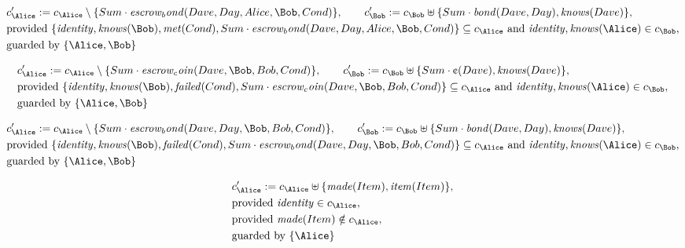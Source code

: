 \begin{align*}
&
c'_
{
\Alice
}
 := 
c_
{
\Alice
}
 \setminus 
\{
Sum
\cdot
\mathit{
escrow_bond
}
(
Dave
,
Day
,
Alice
,
\Bob
,
Cond
)
\}
, \qquad 
c'_
{
\Bob
}
 := 
c_
{
\Bob
}
 \uplus 
\{
Sum
\cdot
\mathit{
bond
}
(
Dave
,
Day
)
,
\mathit{
knows
}
(
Dave
)
\}
,\\
&
\text{provided } 
\{
\mathit{
identity
}
,
\mathit{
knows
}
(
\Bob
)
,
\mathit{
met
}
(
Cond
)
,
Sum
\cdot
\mathit{
escrow_bond
}
(
Dave
,
Day
,
Alice
,
\Bob
,
Cond
)
\}
 \subseteq c_
{
\Alice
}
 \text{ and } 
\mathit{
identity
}
,
\mathit{
knows
}
(
\Alice
)
 \in c_
{
\Bob
}
,\\
&
\text{guarded by } \{
\Alice
,
\Bob
\}
\end{align*}

\begin{align*}
&
c'_
{
\Alice
}
 := 
c_
{
\Alice
}
 \setminus 
\{
Sum
\cdot
\mathit{
escrow_coin
}
(
Dave
,
\Bob
,
Bob
,
Cond
)
\}
, \qquad 
c'_
{
\Bob
}
 := 
c_
{
\Bob
}
 \uplus 
\{
Sum
\cdot
\text{\textcent}
(
Dave
)
,
\mathit{
knows
}
(
Dave
)
\}
,\\
&
\text{provided } 
\{
\mathit{
identity
}
,
\mathit{
knows
}
(
\Bob
)
,
\mathit{
failed
}
(
Cond
)
,
Sum
\cdot
\mathit{
escrow_coin
}
(
Dave
,
\Bob
,
Bob
,
Cond
)
\}
 \subseteq c_
{
\Alice
}
 \text{ and } 
\mathit{
identity
}
,
\mathit{
knows
}
(
\Alice
)
 \in c_
{
\Bob
}
,\\
&
\text{guarded by } \{
\Alice
,
\Bob
\}
\end{align*}

\begin{align*}
&
c'_
{
\Alice
}
 := 
c_
{
\Alice
}
 \setminus 
\{
Sum
\cdot
\mathit{
escrow_bond
}
(
Dave
,
Day
,
\Bob
,
Bob
,
Cond
)
\}
, \qquad 
c'_
{
\Bob
}
 := 
c_
{
\Bob
}
 \uplus 
\{
Sum
\cdot
\mathit{
bond
}
(
Dave
,
Day
)
,
\mathit{
knows
}
(
Dave
)
\}
,\\
&
\text{provided } 
\{
\mathit{
identity
}
,
\mathit{
knows
}
(
\Bob
)
,
\mathit{
failed
}
(
Cond
)
,
Sum
\cdot
\mathit{
escrow_bond
}
(
Dave
,
Day
,
\Bob
,
Bob
,
Cond
)
\}
 \subseteq c_
{
\Alice
}
 \text{ and } 
\mathit{
identity
}
,
\mathit{
knows
}
(
\Alice
)
 \in c_
{
\Bob
}
,\\
&
\text{guarded by } \{
\Alice
,
\Bob
\}
\end{align*}

\begin{align*}
&
c'_
{
\Alice
}
 := 
c_
{
\Alice
}
 \uplus 
\{
\mathit{
made
}
(
Item
)
,
\mathit{
item
}
(
Item
)
\}
,\\
&
\text{provided } 
\mathit{
identity
}
 \in c_
{
\Alice
}
,\\
&
\text{provided } 
\mathit{
made
}
(
Item
)
 \notin c_
{
\Alice
}
,\\
&
\text{guarded by } \{
\Alice
\}
\end{align*}
